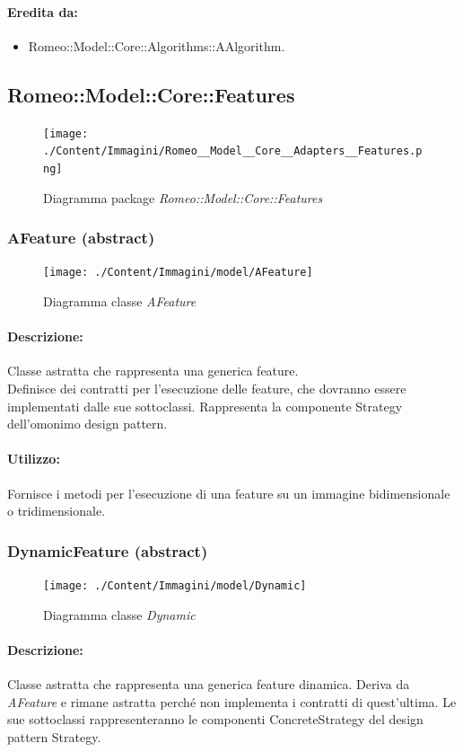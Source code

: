 	\paragraph{Eredita da:}
		\begin{itemize}
			\item Romeo::Model::Core::Algorithms::AAlgorithm.
		\end{itemize}
\subsection{Romeo::Model::Core::Features}
	\begin{figure} [!h]
		\centering
		\texttt{[image: ./Content/Immagini/Romeo\_\_Model\_\_Core\_\_Adapters\_\_Features.png]}
		\caption{Diagramma package \textsl{Romeo::Model::Core::Features}}
	\end{figure}
	\subsubsection{AFeature (abstract)}
	\begin{figure}[!h]
		\centering
		\texttt{[image: ./Content/Immagini/model/AFeature]}
		\caption{Diagramma classe \textsl{AFeature}}
	\end{figure}
	\paragraph{Descrizione:} Classe astratta che rappresenta una generica feature\g{}. \\Definisce dei contratti per l’esecuzione delle feature\g{}, che dovranno essere implementati dalle sue sottoclassi. Rappresenta la componente Strategy dell’omonimo design pattern\g{}.
	\paragraph{Utilizzo:} Fornisce i metodi per l’esecuzione di una feature\g{} su un immagine bidimensionale o tridimensionale.
	\subsubsection{DynamicFeature (abstract)}
	\begin{figure}[!h]
		\centering
		\texttt{[image: ./Content/Immagini/model/Dynamic]}
		\caption{Diagramma classe \textsl{Dynamic}}
	\end{figure}
	\paragraph{Descrizione:} Classe astratta che rappresenta una generica feature\g{} dinamica. Deriva da \textsl{AFeature} e rimane astratta perché non implementa i contratti di quest’ultima. Le sue sottoclassi rappresenteranno le componenti ConcreteStrategy del design pattern\g{} Strategy.
